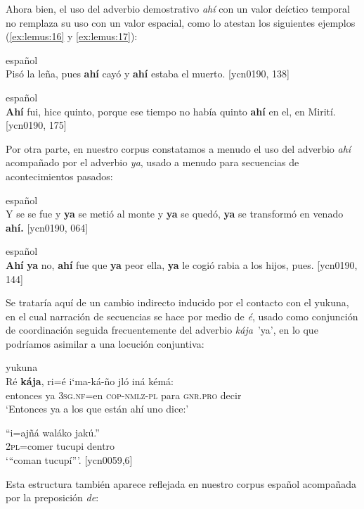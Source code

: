\documentclass[output=paper]{langscibook}
\begin{document}
Ahora bien, el uso del adverbio demostrativo \textit{ahí} con un valor deíctico temporal no remplaza su uso con un valor espacial, como lo atestan los siguientes ejemplos (\ref{ex:lemus:16} y \ref{ex:lemus:17}):

\ea\label{ex:lemus:16}
{español}\\
Pisó la leña, pues \textbf{ahí} cayó y \textbf{ahí} estaba el muerto. {[ycn0190, 138]}\\
\z

\ea\label{ex:lemus:17}
{español}\\
\textbf{Ahí} fui, hice quinto, porque ese tiempo no había quinto \textbf{ahí} en el, en Mirití. {[ycn0190, 175]}\\
\z

Por otra parte, en nuestro corpus constatamos a menudo el uso del adverbio \textit{ahí} acompañado por el adverbio \textit{ya}, usado a menudo para secuencias de acontecimientos pasados: 

\ea\label{ex:lemus:18}
{español}\\
Y se se fue y \textbf{ya} se metió al monte y \textbf{ya} se quedó, \textbf{ya} se transformó en venado \textbf{ahí.} {[ycn0190, 064]}\\
\z

\ea\label{ex:lemus:19}
{español}\\
 \textbf{Ahí} \textbf{ya} no, \textbf{ahí} fue que \textbf{ya} peor ella, \textbf{ya} le cogió rabia a los hijos, pues. {[ycn0190, 144]}\\
 \z

Se trataría aquí de un cambio indirecto inducido por el contacto con el yukuna, en el cual narración de secuencias se hace por medio de \textit{é}, usado como conjunción de coordinación seguida frecuentemente del adverbio \textit{kája}~'ya', en lo que podríamos asimilar a una locución conjuntiva:

\ea\label{ex:lemus:20}
{yukuna}\\
\gll Ré \textbf{kája},   ri=é i‘ma-ká-ño   jló   iná   kémá:\\
     entonces   ya \textsc{3sg.nf=}en \textsc{cop-nmlz-pl} para  \textsc{gnr}.\textsc{pro} decir\\
\glt `Entonces ya a los que están ahí uno dice:'
\z

\ea
\gll “i=ajñá   waláko jakú.”\\
     2\textsc{pl}=comer tucupi dentro\\
\glt `“coman tucupí”'. [ycn0059,6]
\z

Esta estructura también aparece reflejada en nuestro corpus español acompañada por la preposición \textit{de}:
\end{document}

